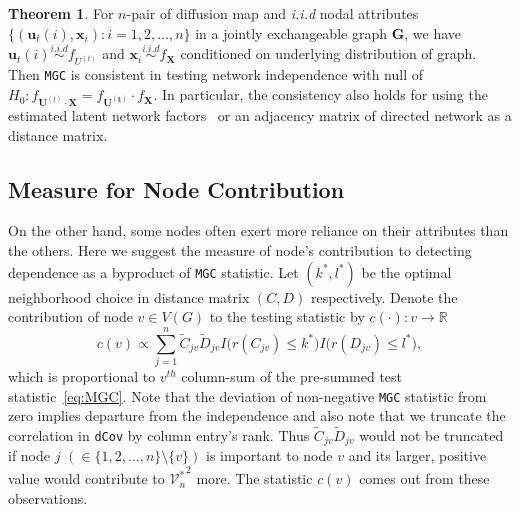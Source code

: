 \documentclass[11pt]{article}
\theoremstyle{definition}
\newtheorem{theorem}{Theorem}[section]
\begin{document}
\begin{theorem}
	\label{theorem2}
	For $n$-pair of diffusion map and \textit{i.i.d} nodal attributes $\{ ( \mathbf{u}_{t}(i),  \mathbf{x}_{i}  ) : i =1,2, \ldots , n \}$ in a jointly exchangeable graph $\mathbf{G}$, we have $\mathbf{u}_{t}(i) \overset{i.i.d}{\sim} f_{U^{(t)}}$ and $\mathbf{x}_{i} \overset{i.i.d}{\sim} f_{\mathbf{X}}$ conditioned on underlying distribution of graph. 
	Then \texttt{MGC} is consistent in testing network independence with null of $H_{0}: f_{\mathbf{U}^{(t)} \cdot \mathbf{X}  }  = f_{\mathbf{U^{(t)}}} \cdot f_{\mathbf{X}}$. In particular, the consistency also holds for using the estimated latent network factors~\citep{fosdick2015testing} or an adjacency matrix of directed network as a distance matrix.
\end{theorem}

\subsection{Measure for Node Contribution}
On the other hand, some nodes often exert more reliance on their attributes than the others. Here we suggest the measure of node's contribution to detecting dependence as a byproduct of \texttt{MGC} statistic. Let $(k^{*}, l^{*})$ be the optimal neighborhood choice in distance matrix $(C, D)$ respectively. Denote the contribution of node $v \in V(G)$ to the testing statistic by  $c(\cdot) : v \rightarrow \mathbb{R}$
\begin{equation}
\label{eq:contribution}
c(v) \propto \sum\limits_{j=1}^{n} \tilde{C}_{j v} \tilde{D}_{j v} I \big(  r (C_{j v}) \leq k^{*}  \big) I \big( r (D_{ j v }) \leq l^{*} \big), 
\end{equation}
which is proportional to $v^{th}$ column-sum of the pre-summed test statistic~\ref{eq:MGC}. Note that the deviation of non-negative \texttt{MGC} statistic from zero implies departure from the independence and also note that we truncate the correlation in \texttt{dCov} by column entry's rank. Thus $\tilde{C}_{jv} \tilde{D}_{jv}$ would not be truncated if node $j$ $(\in \{ 1,2, \ldots, n \} \setminus \{v \} )$ is important to node $v$ and its larger, positive value would contribute to ${\mathcal{V}^{*}_{n}}^2$ more. The statistic $c(v)$ comes out from these observations. 

\end{document}
